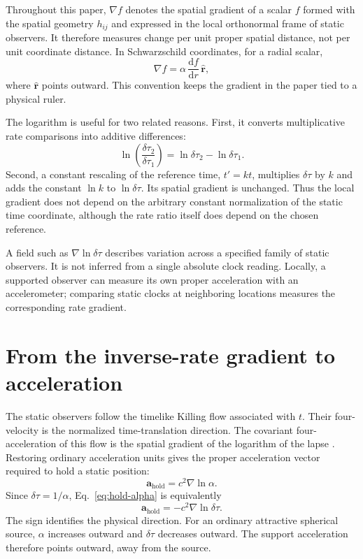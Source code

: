 \documentclass[12pt]{article}
\begin{document}
Throughout this paper, $\nabla f$ denotes the spatial gradient of a scalar $f$ formed with the spatial geometry $h_{ij}$ and expressed in the local orthonormal frame of static observers. It therefore measures change per unit proper spatial distance, not per unit coordinate distance. In Schwarzschild coordinates, for a radial scalar,
\begin{equation}
  \nabla f=\alpha\,\frac{\mathrm{d}f}{\mathrm{d}r}\,\hat{\mathbf{r}},
  \label{eq:radial-gradient}
\end{equation}
where $\hat{\mathbf{r}}$ points outward. This convention keeps the gradient in the paper tied to a physical ruler.

The logarithm is useful for two related reasons. First, it converts multiplicative rate comparisons into additive differences:
\begin{equation}
  \ln\!\left(\frac{\delta\tau_2}{\delta\tau_1}\right)
  =\ln\delta\tau_2-\ln\delta\tau_1.
  \label{eq:log-comparison}
\end{equation}
Second, a constant rescaling of the reference time, $t'=k t$, multiplies $\delta\tau$ by $k$ and adds the constant $\ln k$ to $\ln\delta\tau$. Its spatial gradient is unchanged. Thus the local gradient does not depend on the arbitrary constant normalization of the static time coordinate, although the rate ratio itself does depend on the chosen reference.

A field such as $\nabla\ln\delta\tau$ describes variation across a specified family of static observers. It is not inferred from a single absolute clock reading. Locally, a supported observer can measure its own proper acceleration with an accelerometer; comparing static clocks at neighboring locations measures the corresponding rate gradient.

\section{From the inverse-rate gradient to acceleration}

The static observers follow the timelike Killing flow associated with $t$. Their four-velocity is the normalized time-translation direction. The covariant four-acceleration of this flow is the spatial gradient of the logarithm of the lapse \cite{Wald,SantiagoVisser}. Restoring ordinary acceleration units gives the proper acceleration vector required to hold a static position:
\begin{equation}
  \mathbf{a}_{\mathrm{hold}}
  =c^2\nabla\ln\alpha.
  \label{eq:hold-alpha}
\end{equation}
Since $\delta\tau=1/\alpha$, Eq.~\eqref{eq:hold-alpha} is equivalently
\begin{equation}
  \boxed{\mathbf{a}_{\mathrm{hold}}
  =-c^2\nabla\ln\delta\tau.}
  \label{eq:hold-delta}
\end{equation}
The sign identifies the physical direction. For an ordinary attractive spherical source, $\alpha$ increases outward and $\delta\tau$ decreases outward. The support acceleration therefore points outward, away from the source.
\end{document}
